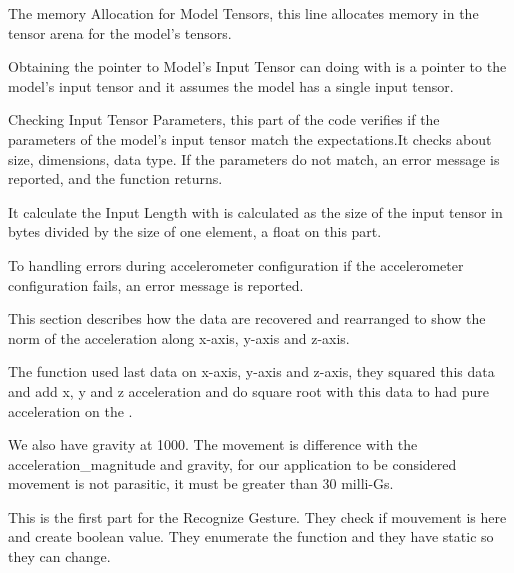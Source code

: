 The memory Allocation for Model Tensors, this line allocates memory in the tensor arena for the model's tensors. 

Obtaining the pointer to Model's Input Tensor can doing with  is a pointer to the model's input tensor and it assumes the model has a single input tensor.

Checking Input Tensor Parameters, this part of the code verifies if the parameters of the model's input tensor match the expectations.It checks about size, dimensions, data type. If the parameters do not match, an error message is reported, and the function returns.

It calculate the Input Length with  is calculated as the size of the input tensor in bytes divided by the size of one element, a float on this part.

To handling errors during accelerometer configuration if the accelerometer configuration fails, an error message is reported.

\begin{center}
    \label{Magic Wand function}
\end{center}

This section describes how the data are recovered and rearranged to show the norm of the acceleration along x-axis, y-axis and z-axis.

The function used last data on x-axis, y-axis and z-axis, they squared this data and add x, y and z acceleration and do square root with this data to had pure acceleration on the .

We also have gravity at 1000. The movement is difference with the acceleration\_magnitude and gravity, for our application to be considered movement is not parasitic, it must be greater than 30 milli-Gs.  

\begin{center}
    \label{Magic Wand function}
\end{center}

This is the first part for the Recognize Gesture. They check if mouvement is here and create boolean value. They enumerate the function and they have static so they can change. 

